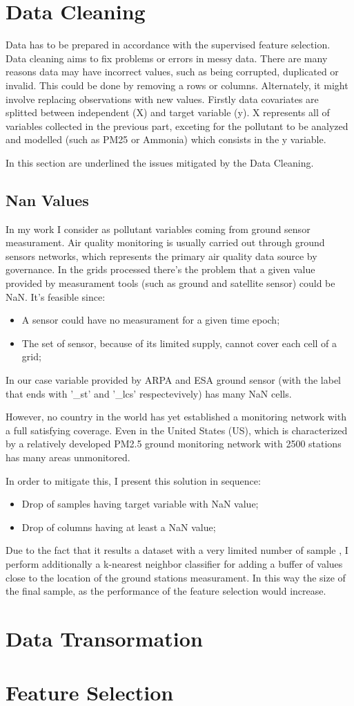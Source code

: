 \section{Data Cleaning}
Data has to be prepared in accordance with the supervised feature selection.
Data cleaning aims to fix problems or errors in messy data. There are many reasons data may have incorrect values, such as being corrupted, duplicated or invalid. 
This could be done by removing a rows or columns. Alternately, it might involve replacing observations with new values. 
Firstly data covariates are splitted between independent (X) and target variable (y). X represents all of variables collected in the previous part, exceting for the pollutant to be analyzed and modelled (such as PM25 or Ammonia) which consists in the y variable.

In this section are underlined the issues mitigated by the Data Cleaning.
\subsection{Nan Values}
In my work I consider as pollutant variables coming from ground sensor measurament.
Air quality monitoring is usually carried out through ground sensors networks, which represents the primary air quality data source by governance. 
In the grids processed there's the problem that a given value provided by measurament tools (such as ground and satellite sensor) could be NaN. 
It's feasible since:
\begin{itemize}
\item A sensor could have no measurament for a given time epoch;
\item The set of sensor, because of its limited supply, cannot cover each cell of a grid;
\end{itemize}
In our case variable provided by ARPA and ESA ground sensor (with the label that ends with '\_st' and '\_lcs' respectevively) has many NaN cells.

However, no country in the world has yet established a monitoring network with a full satisfying coverage\cite{liu2018improve}. Even in the United States (US), which is characterized by a relatively developed PM2.5 ground monitoring network with 2500 stations has many areas unmonitored\cite{liu2018improve}. 

In order to mitigate this, I present this solution in sequence:
\begin{itemize}
\item Drop of samples having target variable with NaN value;
\item Drop of columns having at least a NaN value;
\end{itemize}
Due to the fact that it results a dataset with a very limited number of sample \cite{zhang2018strategy}, I perform additionally a k-nearest neighbor classifier\cite{taunk2019brief} for adding a buffer of values close to the location of the ground stations measurament.
In this way the size of the final sample, as the performance of the feature selection would increase.



\section{Data Transormation}
\section{Feature Selection}




